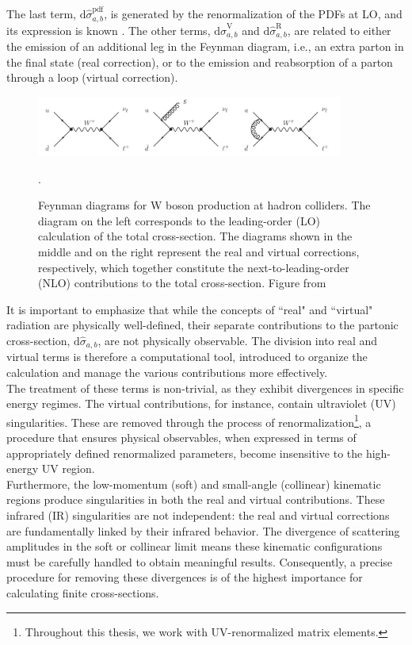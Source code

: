 \documentclass[a4paper, 12pt]{book}
\begin{document}
The last term, $\mathrm{d} \hat{\sigma}_{a,b}^{\mathrm{pdf}}$, is generated by the renormalization of the PDFs at LO, and its expression is known \cite{Catani:1996vz}. The other terms, $\mathrm{d} \hat{\sigma}_{a,b}^{\mathrm{V}}$ and $\mathrm{d} \hat{\sigma}_{a,b}^{\mathrm{R}}$, are related to either the emission of an additional leg in the Feynman diagram, i.e., an extra parton in the final state (real correction), or to the emission and reabsorption of a parton through a loop (virtual correction).  \par\bigskip
\begin{figure}[!ht]
	\centering
	\includegraphics[width=0.9\textwidth]{imgs/real-and-virtual.png}
	\caption{Feynman diagrams for W boson production at hadron colliders. The diagram on the left corresponds to the leading-order (LO) calculation of the total cross-section. The diagrams shown in the middle and on the right represent the real and virtual corrections, respectively, which together constitute the next-to-leading-order (NLO) contributions to the total cross-section. Figure from \cite{Campbell:2017}}.
	\label{hadron-collision}
\end{figure}
It is important to emphasize that while the concepts of ``real" and ``virtual" radiation are physically well-defined, their separate contributions to the partonic cross-section, $\mathrm{d}\hat{\sigma}_{a,b}$, are not physically observable. The division into real and virtual terms is therefore a computational tool, introduced to organize the calculation and manage the various contributions more effectively. \\ The treatment of these terms is non-trivial, as they exhibit divergences in specific energy regimes. The virtual contributions, for instance, contain ultraviolet (UV) singularities. These are removed through the process of renormalization\footnote{Throughout this thesis, we work with UV-renormalized matrix elements.}, a procedure that ensures physical observables, when expressed in terms of appropriately defined renormalized parameters, become insensitive to the high-energy UV region. \\ Furthermore, the low-momentum (soft) and small-angle (collinear) kinematic regions produce singularities in both the real and virtual contributions. These infrared (IR) singularities are not independent: the real and virtual corrections are fundamentally linked by their infrared behavior. The divergence of scattering amplitudes in the soft or collinear limit means these kinematic configurations must be carefully handled to obtain meaningful results. Consequently, a precise procedure for removing these divergences is of the highest importance for calculating finite cross-sections.
\end{document}
